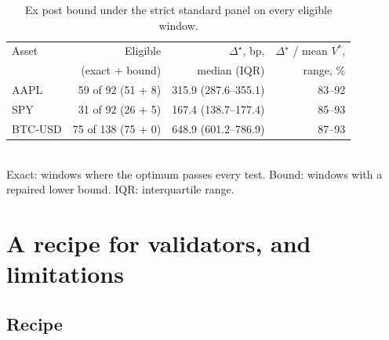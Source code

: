 \documentclass[11pt]{article}
\begin{document}
\begin{table}[tbp]
\caption{Ex post bound under the strict standard panel on every eligible
window.}
\label{tab:expost}
\small
\centering
\setlength{\tabcolsep}{4pt}
\begin{tabular}{lrrr}
\toprule
Asset & Eligible & $\Delta^\star$, bp, & $\Delta^\star$ / mean $V^*$, \\
 & (exact + bound) & median (IQR) & range, \% \\
\midrule
AAPL & 59 of 92 (51 + 8) & 315.9 (287.6--355.1) & 83--92 \\
SPY & 31 of 92 (26 + 5) & 167.4 (138.7--177.4) & 85--93 \\
BTC-USD & 75 of 138 (75 + 0) & 648.9 (601.2--786.9) & 87--93 \\
\bottomrule
\end{tabular}
\\[2pt]
\footnotesize Exact: windows where the optimum passes every test. Bound: windows with a repaired lower bound. IQR: interquartile range.
\end{table}

\section{A recipe for validators, and limitations}
\label{sec:recipe}

\subsection{Recipe}
\end{document}
